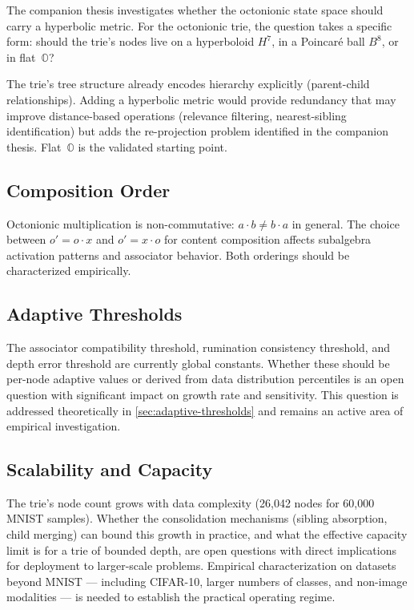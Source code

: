 \documentclass[11pt,a4paper]{article}
\theoremstyle{definition}
\theoremstyle{remark}
\newcommand{\Oct}{\mathbb{O}}
\begin{document}
The companion thesis investigates whether the octonionic state space should carry a hyperbolic metric. For the octonionic trie, the question takes a specific form: should the trie's nodes live on a hyperboloid $H^7$, in a Poincar\'{e} ball $B^8$, or in flat~$\Oct$?

The trie's tree structure already encodes hierarchy explicitly (parent-child relationships). Adding a hyperbolic metric would provide redundancy that may improve distance-based operations (relevance filtering, nearest-sibling identification) but adds the re-projection problem identified in the companion thesis. Flat~$\Oct$ is the validated starting point.

\subsection{Composition Order}

Octonionic multiplication is non-commutative: $a \cdot b \neq b \cdot a$ in general. The choice between $o' = o \cdot x$ and $o' = x \cdot o$ for content composition affects subalgebra activation patterns and associator behavior. Both orderings should be characterized empirically.

\subsection{Adaptive Thresholds}

The associator compatibility threshold, rumination consistency threshold, and depth error threshold are currently global constants. Whether these should be per-node adaptive values or derived from data distribution percentiles is an open question with significant impact on growth rate and sensitivity. This question is addressed theoretically in \cref{sec:adaptive-thresholds} and remains an active area of empirical investigation.

\subsection{Scalability and Capacity}

The trie's node count grows with data complexity (26,042 nodes for 60,000 MNIST samples). Whether the consolidation mechanisms (sibling absorption, child merging) can bound this growth in practice, and what the effective capacity limit is for a trie of bounded depth, are open questions with direct implications for deployment to larger-scale problems. Empirical characterization on datasets beyond MNIST --- including CIFAR-10, larger numbers of classes, and non-image modalities --- is needed to establish the practical operating regime.
\end{document}
